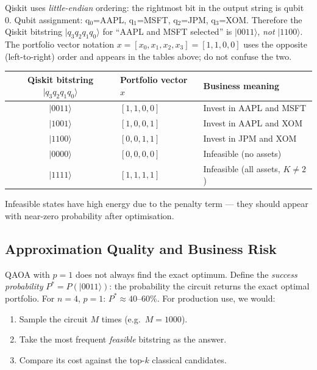 \documentclass[a4paper,11pt]{article}
\newcommand{\ket}[1]{|#1\rangle}
\begin{document}
\begin{warningbox}
Qiskit uses \emph{little-endian} ordering: the rightmost bit in the
output string is qubit 0. Qubit assignment: q$_0$=AAPL, q$_1$=MSFT,
q$_2$=JPM, q$_3$=XOM. Therefore the Qiskit bitstring
$\ket{q_3 q_2 q_1 q_0}$ for ``AAPL and MSFT selected'' is
$\ket{0011}$, \emph{not} $\ket{1100}$. The portfolio vector notation
$x = [x_0, x_1, x_2, x_3] = [1,1,0,0]$ uses the opposite (left-to-right)
order and appears in the tables above; do not confuse the two.
\end{warningbox}

\begin{finbox}
\begin{center}
\begin{tabular}{cll}
    \toprule
    Qiskit bitstring $\ket{q_3 q_2 q_1 q_0}$ & Portfolio vector $x$ & Business meaning \\
    \midrule
    $\ket{0011}$ & $[1,1,0,0]$ & Invest in AAPL and MSFT \\
    $\ket{1001}$ & $[1,0,0,1]$ & Invest in AAPL and XOM \\
    $\ket{1100}$ & $[0,0,1,1]$ & Invest in JPM and XOM \\
    $\ket{0000}$ & $[0,0,0,0]$ & Infeasible (no assets) \\
    $\ket{1111}$ & $[1,1,1,1]$ & Infeasible (all assets, $K \neq 2$) \\
    \bottomrule
\end{tabular}
\end{center}
Infeasible states have high energy due to the penalty term —
they should appear with near-zero probability after optimisation.
\end{finbox}

\subsection{Approximation Quality and Business Risk}

QAOA with $p=1$ does not always find the exact optimum. Define the
\emph{success probability} $P^* = P(\ket{0011})$: the probability
the circuit returns the exact optimal portfolio. For $n=4$, $p=1$:
$P^* \approx 40$--$60\%$. For production use, we would:

\begin{enumerate}
    \item Sample the circuit $M$ times (e.g.\ $M=1000$).
    \item Take the most frequent \emph{feasible} bitstring as the answer.
    \item Compare its cost against the top-$k$ classical candidates.
\end{enumerate}
\end{document}
